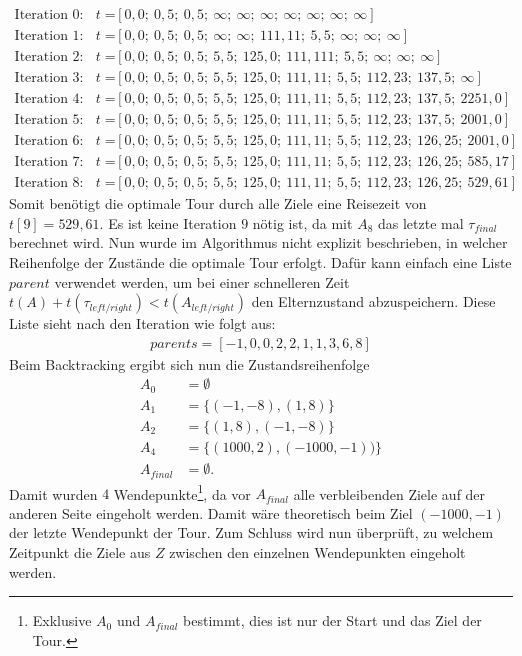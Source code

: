 \documentclass[german,version-2019-11]{uzl-thesis}
\begin{document}
\begin{example}
\begin{align*}
\text{Iteration 0:}~~~~t=&[0,0;~ 0,5;~ 0,5;~ \infty;~ \infty;~ \infty;~ \infty;~ \infty;~ \infty;~ \infty] \\
\text{Iteration 1:}~~~~t=&[0,0;~ 0,5;~ 0,5;~ \infty;~ \infty;~ 111,11;~ 5,5;~ \infty;~ \infty;~ \infty] \\
\text{Iteration 2:}~~~~t=&[0,0;~ 0,5;~ 0,5;~ 5,5;~ 125,0;~ 111,111;~ 5,5;~ \infty;~ \infty;~ \infty] \\
\text{Iteration 3:}~~~~t=&[0,0;~ 0,5;~ 0,5;~ 5,5;~ 125,0;~ 111,11;~ 5,5;~ 112,23;~ 137,5;~ \infty] \\
\text{Iteration 4:}~~~~t=&[0,0;~ 0,5;~ 0,5;~ 5,5;~ 125,0;~ 111,11;~ 5,5;~ 112,23;~ 137,5;~ 2251,0] \\
\text{Iteration 5:}~~~~t=&[0,0;~ 0,5;~ 0,5;~ 5,5;~ 125,0;~ 111,11;~ 5,5;~ 112,23;~ 137,5;~ 2001,0] \\
\text{Iteration 6:}~~~~t=&[0,0;~ 0,5;~ 0,5;~ 5,5;~ 125,0;~ 111,11;~ 5,5;~ 112,23;~ 126,25;~ 2001,0] \\
\text{Iteration 7:}~~~~t=&[0,0;~ 0,5;~ 0,5;~ 5,5;~ 125,0;~ 111,11;~ 5,5;~ 112,23;~ 126,25;~ 585,17] \\
\text{Iteration 8:}~~~~t=&[0,0;~ 0,5;~ 0,5;~ 5,5;~ 125,0;~ 111,11;~ 5,5;~ 112,23;~ 126,25;~ 529,61]
\end{align*}
Somit benötigt die optimale Tour durch alle Ziele eine Reisezeit von $t[9]=529,61$. Es ist keine Iteration $9$ nötig ist, da mit $A_{8}$ das letzte mal $\tau_{final}$ berechnet wird. Nun wurde im Algorithmus nicht explizit beschrieben, in welcher Reihenfolge der Zustände die optimale Tour erfolgt. Dafür kann einfach eine Liste $parent$ verwendet werden, um bei einer schnelleren Zeit {$t(A) + t(\tau_{left/right}) < t(A_{left/right})$} den Elternzustand abzuspeichern. Diese Liste sieht nach den Iteration wie folgt aus:
\begin{align*}
parents = [-1, 0, 0, 2, 2, 1, 1, 3, 6, 8]
\end{align*}
Beim Backtracking ergibt sich nun die Zustandsreihenfolge
\begin{align*}
A_0&=\emptyset\\
A_1&=\{(-1, -8), (1, 8)\}\\
A_2&=\{(1, 8), (-1, -8)\}\\ 
A_4&=\{(1000, 2), (-1000, -1))\}\\
A_{final}&=\emptyset.
\end{align*}
Damit wurden $4$ Wendepunkte\footnote{Exklusive $A_0$ und $A_{final}$ bestimmt, dies ist nur der Start und das Ziel der Tour.}, da vor $A_{final}$ alle verbleibenden Ziele auf der anderen Seite eingeholt werden. Damit wäre theoretisch beim Ziel $(-1000,-1)$ der letzte Wendepunkt der Tour. Zum Schluss wird nun überprüft, zu welchem Zeitpunkt die Ziele aus $Z$ zwischen den einzelnen Wendepunkten eingeholt werden.

\end{example}
\end{document}
